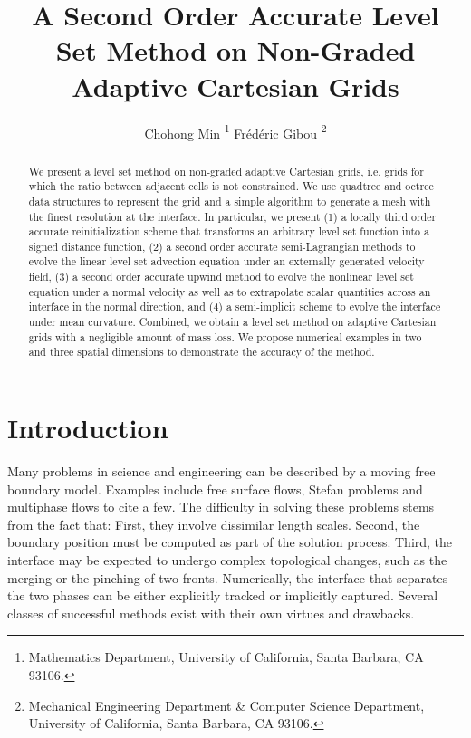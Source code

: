 \documentclass[english]{article}
\begin{document}
%
%
\title{A Second Order Accurate Level Set Method on Non-Graded Adaptive Cartesian Grids}
\author{Chohong Min \thanks{Mathematics Department, University of California, Santa Barbara, CA 93106.} \hspace{2cm}
Fr\'{e}d\'{e}ric Gibou \thanks{Mechanical Engineering Department \& Computer Science Department,
University of California, Santa Barbara, CA 93106.}} \maketitle
\begin{abstract}
We present a level set method on non-graded adaptive Cartesian grids, i.e.
grids for which the ratio between adjacent cells is not constrained. We use
quadtree and octree data structures to represent the grid and a simple
algorithm to generate a mesh with the finest resolution at the interface.
In particular, we present (1) a locally third order accurate
reinitialization scheme that transforms an arbitrary level set function
into a signed distance function, (2) a second order accurate
semi-Lagrangian methods to evolve the linear level set advection equation
under an externally generated velocity field, (3) a second order accurate
upwind method to evolve the nonlinear level set equation under a normal
velocity as well as to extrapolate scalar quantities across an interface in
the normal direction, and (4) a semi-implicit scheme to evolve the
interface under mean curvature. Combined, we obtain a level set method on
adaptive Cartesian grids with a negligible amount of mass loss. We propose
numerical examples in two and three spatial dimensions to demonstrate the
accuracy of the method.
\end{abstract}


%
%
\section{Introduction}

Many problems in science and engineering can be described by a moving free
boundary model. Examples include free surface flows, Stefan problems and
multiphase flows to cite a few. The difficulty in solving these problems
stems from the fact that: First, they involve dissimilar length scales.
Second, the boundary position must be computed as part of the solution
process. Third, the interface may be expected to undergo complex
topological changes, such as the merging or the pinching of two fronts.
Numerically, the interface that separates the two phases can be either
explicitly tracked or implicitly captured. Several classes of successful
methods exist with their own virtues and drawbacks.
\end{document}
